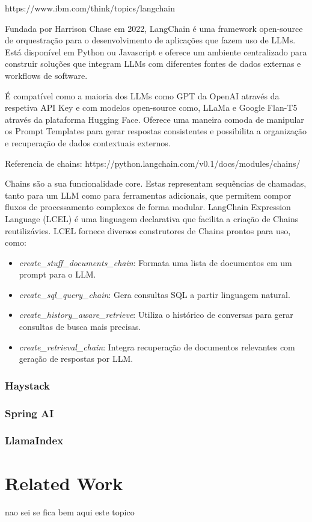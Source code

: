https://www.ibm.com/think/topics/langchain

Fundada por Harrison Chase em 2022, LangChain é uma framework open-source de orquestração para o desenvolvimento de aplicações que fazem uso de LLMs. Está disponível em Python ou Javascript e oferece um ambiente centralizado para construir soluções que integram LLMs com diferentes fontes de dados externas e workflows de software.

É compatível como a maioria dos LLMs como GPT da OpenAI através da respetiva API Key e com modelos open-source como, LLaMa e Google Flan-T5 através da plataforma Hugging Face. 
Oferece uma maneira comoda de manipular os Prompt Templates para gerar respostas consistentes e possibilita a organização e recuperação de dados contextuais externos. 

Referencia de chains: https://python.langchain.com/v0.1/docs/modules/chains/

Chains são a sua funcionalidade core. Estas representam sequências de chamadas, tanto para um LLM como para ferramentas adicionais, que permitem compor fluxos de processamento complexos de forma modular. LangChain Expression Language (LCEL) é uma linguagem declarativa que facilita a criação de Chains reutilizávies. LCEL fornece diversos construtores de Chains prontos para uso, como: 

\begin{itemize}
	\item \textit{create\_stuff\_documents\_chain}: Formata uma lista de documentos em um prompt para o LLM.
	\item \textit{create\_sql\_query\_chain}: Gera consultas SQL a partir linguagem natural.
	\item \textit{create\_history\_aware\_retrieve}: Utiliza o histórico de conversas para gerar consultas de busca mais precisas.
	\item \textit{create\_retrieval\_chain}: Integra recuperação de documentos relevantes com geração de respostas por LLM.
\end{itemize}









\subsubsection{Haystack}


\subsubsection{Spring AI}

\subsubsection{LlamaIndex}






\section{Related Work}

nao sei se fica bem aqui este topico



